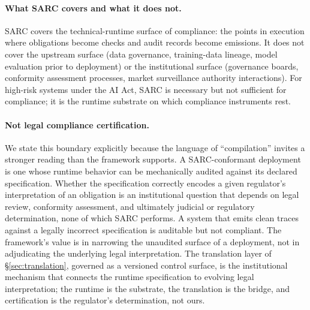 \documentclass[11pt,a4paper]{article}
\theoremstyle{remark}
\begin{document}
\paragraph{What SARC covers and what it does not.} SARC covers the technical-runtime surface of compliance: the points in execution where obligations become checks and audit records become emissions. It does not cover the upstream surface (data governance, training-data lineage, model evaluation prior to deployment) or the institutional surface (governance boards, conformity assessment processes, market surveillance authority interactions). For high-risk systems under the AI Act, SARC is necessary but not sufficient for compliance; it is the runtime substrate on which compliance instruments rest.

\paragraph{Not legal compliance certification.} We state this boundary explicitly because the language of ``compilation'' invites a stronger reading than the framework supports. A SARC-conformant deployment is one whose runtime behavior can be mechanically audited against its declared specification. Whether the specification correctly encodes a given regulator's interpretation of an obligation is an institutional question that depends on legal review, conformity assessment, and ultimately judicial or regulatory determination, none of which SARC performs. A system that emits clean traces against a legally incorrect specification is auditable but not compliant. The framework's value is in narrowing the unaudited surface of a deployment, not in adjudicating the underlying legal interpretation. The translation layer of \S\ref{sec:translation}, governed as a versioned control surface, is the institutional mechanism that connects the runtime specification to evolving legal interpretation; the runtime is the substrate, the translation is the bridge, and certification is the regulator's determination, not ours.
\end{document}
